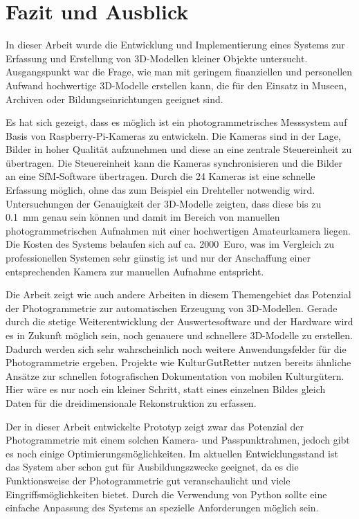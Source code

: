 \documentclass[./00PhotoBox.tex]{subfiles}
\begin{document}
\chapter{Fazit und Ausblick}
\label{c:fazitausblick}


In dieser Arbeit wurde die Entwicklung und Implementierung eines Systems zur Erfassung und Erstellung von 3D-Modellen kleiner Objekte untersucht. Ausgangspunkt war die Frage, wie man mit geringem finanziellen und personellen Aufwand hochwertige 3D-Modelle erstellen kann, die für den Einsatz in Museen, Archiven oder Bildungseinrichtungen geeignet sind.

Es hat sich gezeigt, dass es möglich ist ein photogrammetrisches Messsystem auf Basis von Raspberry-Pi-Kameras zu entwickeln. Die Kameras sind in der Lage, Bilder in hoher Qualität aufzunehmen und diese an eine zentrale Steuereinheit zu übertragen. Die Steuereinheit kann die Kameras synchronisieren und die Bilder an eine \acrshort{SfM}-Software übertragen. Durch die 24 Kameras ist eine schnelle Erfassung möglich, ohne das zum Beispiel ein Drehteller notwendig wird. Untersuchungen der Genauigkeit der 3D-Modelle zeigten, dass diese bis zu \SI{0,1}{\milli\metre} genau sein können und damit im Bereich von manuellen photogrammetrischen Aufnahmen mit einer hochwertigen Amateurkamera liegen. Die Kosten des Systems belaufen sich auf ca. \SI{2000}{Euro}, was im Vergleich zu professionellen Systemen sehr günstig ist und nur der Anschaffung einer entsprechenden Kamera zur manuellen Aufnahme entspricht.



Die Arbeit zeigt wie auch andere Arbeiten in diesem Themengebiet das Potenzial der Photogrammetrie zur au\-to\-ma\-tischen Erzeugung von 3D-Modellen. Gerade durch die stetige Weiterentwicklung der Auswertesoftware und der Hardware wird es in Zukunft möglich sein, noch genauere und schnellere 3D-Modelle zu erstellen. Dadurch werden sich sehr wahrscheinlich noch weitere Anwendungsfelder für die Photogrammetrie ergeben. Projekte wie KulturGutRetter \citep[vgl.][]{kulturgutretter} nutzen bereits ähnliche Ansätze zur schnellen fotografischen Dokumentation von mobilen Kulturgütern. Hier wäre es nur noch ein kleiner Schritt, statt eines einzelnen Bildes gleich Daten für die dreidimensionale Rekonstruktion zu erfassen.

Der in dieser Arbeit entwickelte Prototyp zeigt zwar das Potenzial der Photogrammetrie mit einem solchen Kamera- und Passpunktrahmen, jedoch gibt es noch einige Optimierungsmöglichkeiten. Im aktuellen Entwicklungsstand ist das System aber schon gut für Ausbildungszwecke geeignet, da es die Funktionsweise der Photogrammetrie gut veranschaulicht und viele Eingriffsmöglichkeiten bietet. Durch die Verwendung von Python sollte eine einfache Anpassung des Systems an spezielle Anforderungen möglich sein.
\end{document}
